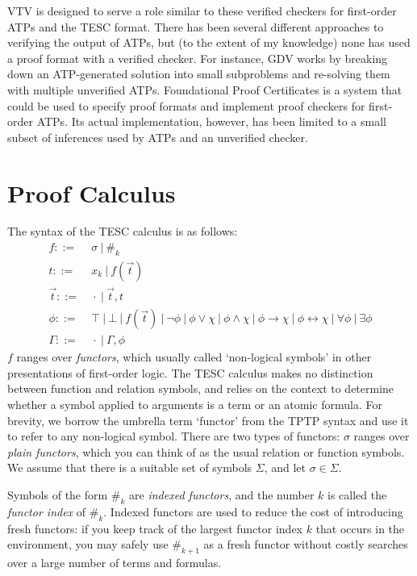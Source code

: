 \documentclass[12pt]{article}
\newcommand{\idf}[1]{\#_{#1}}
\begin{document}
VTV is designed to serve a role similar to these verified checkers for first-order ATPs
and the TESC format.
There has been several different approaches to verifying the output of ATPs, but 
(to the extent of my knowledge) none has used a proof format with a verified checker. 
For instance, GDV \cite{sutcliffe2006semantic} works by breaking down an ATP-generated 
solution into small subproblems and re-solving them with multiple unverified ATPs. 
Foundational Proof Certificates \cite{chihani2013foundational} is a system that could 
be used to specify proof formats and implement proof checkers for first-order ATPs.
Its actual implementation, however, \cite{chihani2015proof} has been limited to a small 
subset of inferences used by ATPs and an unverified checker.



\section{Proof Calculus} \label{set:proof-calc} 

The syntax of the TESC calculus is as follows:
\begin{align*}
f ::= &\ \sigma\ |\ \idf{k}\\
t ::= &\ x_k\ |\ f(\vec{t})\\
\vec{t} ::= &\ \cdot\ |\ \vec{t}, t\\
\phi ::= &\ \top\ |\ \bot\ |\ f(\vec{t})\ |\ \lnot \phi\ |\ \phi \lor \chi\ |\ \phi \land \chi\ |\ \phi \to \chi\ |\ \phi \leftrightarrow \chi\ |\ \forall \phi\ |\ \exists \phi\\
\Gamma ::= &\ \cdot\ |\ \Gamma, \phi
\end{align*}
$f$ ranges over \textit{functors}, which usually called `non-logical symbols' in
other presentations of first-order logic. The TESC calculus makes no distinction
between function and relation symbols, and relies on the context to determine whether 
a symbol applied to arguments is a term or an atomic formula. For brevity, we borrow
the umbrella term `functor' from the TPTP syntax and use it to refer to any non-logical symbol.
There are two types of functors: $\sigma$ ranges over \textit{plain functors}, 
which you can think of as the usual relation or function symbols. We assume that there 
is a suitable set of symbols $\Sigma$, and let $\sigma \in \Sigma$.

Symbols of the form $\idf{k}$ are \textit{indexed functors}, and the number $k$ is 
called the \textit{functor index} of $\idf{k}$. Indexed functors are used to reduce 
the cost of introducing fresh functors: if you keep track of the largest functor index
$k$ that occurs in the environment, you may safely use $\idf{k+1}$ as a fresh functor
without costly searches over a large number of terms and formulas.
\end{document}
